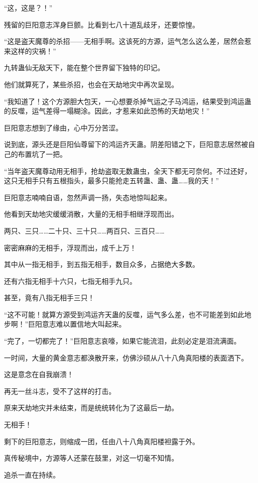 \begin{this_body}
“这，这是？！”

残留的巨阳意志浑身巨颤。比看到七八十道乱歧牙，还要惊惶。

“这是盗天魔尊的杀招——无相手啊。这该死的方源，运气怎么这么差，居然会惹来这样的灾祸！”

九转蛊仙无敌天下，能在整个世界留下独特的印记。

他们就算死了，某些杀招，也会在天劫地灾中再次呈现。

“我知道了！这个方源胆大包天，一心想要杀掉气运之子马鸿运，结果受到鸿运蛊的反噬，运气差得一塌糊涂。因此，才惹来如此恐怖的天劫地灾！”

巨阳意志想到了缘由，心中万分苦涩。

说到底，源头还是巨阳仙尊留下的鸿运齐天蛊。阴差阳错之下，巨阳意志居然被自己的布置坑了一把。

“当年盗天魔尊动用无相手，抢劫盗取无数蛊虫，全天下都无可奈何。不过还好，这只无相手只有五根指头，最多只能抢走五转蛊、蛊、蛊……我的天！”

巨阳意志喃喃自语，忽然声调一扬，失态地惊叫起来。

他看到天劫地灾缓缓消散，大量的无相手相继浮现而出。

两只、三只……二十只、三十只……两百只、三百只……

密密麻麻的无相手，浮现而出，成千上万！

其中从一指无相手，到五指无相手，数目众多，占据绝大多数。

还有六指无相手十六只，七指无相手九只。

甚至，竟有八指无相手三只！

“这不可能！就算方源受到鸿运齐天蛊的反噬，运气多么差，也不可能差到如此地步啊！”巨阳意志难以置信地大叫起来。

“完了，一切都完了！”巨阳意志哀嚎，如果它能流泪，此刻必定是泪流满面。

一时间，大量的黄金意志都涣散开来，仿佛沙硕从八十八角真阳楼的表面洒下。

这是意念在自我崩溃！

再无一丝斗志，受不了这样的打击。

原来天劫地灾并未结束，而是统统转化为了这最后一劫。

无相手！

剩下的巨阳意志，则缩成一团，任由八十八角真阳楼袒露于外。

真传秘境中，方源等人还蒙在鼓里，对这一切毫不知情。

追杀一直在持续。


\end{this_body}

